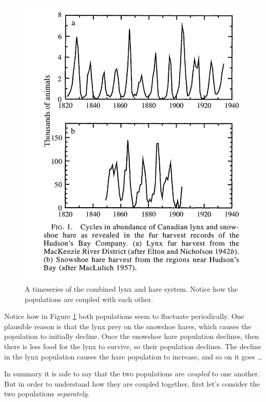 \documentclass[
]{book}
\theoremstyle{definition}
\theoremstyle{definition}
\theoremstyle{definition}
\theoremstyle{remark}
\begin{document}
\begin{figure}
\includegraphics[width=11.89in]{figures/03-systems/lynx-hare-timeseries} \caption{A timeseries of the combined lynx and hare system.  Notice how the populations are coupled with each other.}\label{fig:lynx-hare-time}
\end{figure}

Notice how in Figure \ref{fig:lynx-hare-time} both populations seem to fluctuate periodically. One plausible reason is that the lynx prey on the snowshoe hares, which causes the population to initially decline. Once the snowshoe hare population declines, then there is less food for the lynx to survive, so their population declines. The decline in the lynx population causes the hare population to increase, and so on it goes \ldots{}

In summary it is safe to say that the two populations are \emph{coupled} to one another. But in order to understand how they are coupled together, first let's consider the two populations \emph{separately}.
\end{document}
